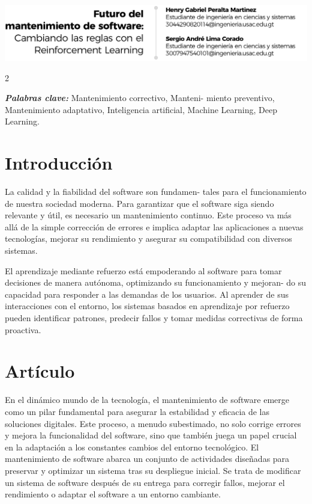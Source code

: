 \documentclass[12pt,spanish,Letterpaper,openany]{book}
\begin{document}
\begin{center}\includegraphics[width=1\linewidth]{autores/pareja55_01} \end{center}

\begin {multicols}{2}

\textbf{\emph{Palabras clave:}} Mantenimiento correctivo, Manteni-
miento preventivo, Mantenimiento adaptativo, Inteligencia artificial, Machine Learning, Deep Learning.

\hypertarget{introducciuxf3n-9}{%
\section{Introducción}\label{introducciuxf3n-9}}

La calidad y la fiabilidad del software son fundamen-
tales para el funcionamiento de nuestra sociedad moderna. Para garantizar que el software siga siendo relevante y útil, es necesario un mantenimiento continuo. Este proceso va más allá de la simple corrección de errores e implica adaptar las aplicaciones a nuevas tecnologías, mejorar su rendimiento y asegurar su compatibilidad con diversos sistemas.

El aprendizaje mediante refuerzo está empoderando al software para tomar decisiones de manera autónoma, optimizando su funcionamiento y mejoran-
do su capacidad para responder a las demandas de los usuarios. Al aprender de sus interacciones con el entorno, los sistemas basados en aprendizaje por refuerzo pueden identificar patrones, predecir fallos y tomar medidas correctivas de forma proactiva.

\hypertarget{artuxedculo-9}{%
\section{Artículo}\label{artuxedculo-9}}

En el dinámico mundo de la tecnología, el mantenimiento de software emerge como un pilar fundamental para asegurar la estabilidad y eficacia de las soluciones digitales. Este proceso, a menudo subestimado, no solo corrige errores y mejora la funcionalidad del software, sino que también juega un papel crucial en la adaptación a los constantes cambios del entorno tecnológico. El mantenimiento de software abarca un conjunto de actividades diseñadas para
preservar y optimizar un sistema tras su despliegue inicial. Se trata de modificar un sistema de software después de su entrega para corregir fallos, mejorar el rendimiento o adaptar el software a un entorno cambiante.


\end{multicols}
\end{document}
